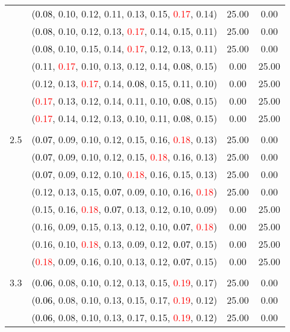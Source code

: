 \documentclass[10pt,a4paper]{report}
\begin{document}
\begin{center}
\begin{longtable}{clcc}
			&(\textcolor{black}{0.08}, 0.10, 0.12, 0.11, 0.13, 0.15, \textcolor{red}{0.17}, 0.14)&25.00&0.00\\
			&(\textcolor{black}{0.08}, 0.10, 0.12, 0.13, \textcolor{red}{0.17}, 0.14, 0.15, 0.11)&25.00&0.00\\
			&(\textcolor{black}{0.08}, 0.10, 0.15, 0.14, \textcolor{red}{0.17}, 0.12, 0.13, 0.11)&25.00&0.00\\
			&(0.11, \textcolor{red}{0.17}, 0.10, 0.13, 0.12, 0.14, \textcolor{black}{0.08}, 0.15)&0.00&25.00\\
			&(0.12, 0.13, \textcolor{red}{0.17}, 0.14, \textcolor{black}{0.08}, 0.15, 0.11, 0.10)&0.00&25.00\\
			&(\textcolor{red}{0.17}, 0.13, 0.12, 0.14, 0.11, 0.10, \textcolor{black}{0.08}, 0.15)&0.00&25.00\\
			&(\textcolor{red}{0.17}, 0.14, 0.12, 0.13, 0.10, 0.11, \textcolor{black}{0.08}, 0.15)&0.00&25.00\\
		&&&\\
		2.5			&(\textcolor{black}{0.07}, 0.09, 0.10, 0.12, 0.15, 0.16, \textcolor{red}{0.18}, 0.13)&25.00&0.00\\
			&(\textcolor{black}{0.07}, 0.09, 0.10, 0.12, 0.15, \textcolor{red}{0.18}, 0.16, 0.13)&25.00&0.00\\
			&(\textcolor{black}{0.07}, 0.09, 0.12, 0.10, \textcolor{red}{0.18}, 0.16, 0.15, 0.13)&25.00&0.00\\
			&(0.12, 0.13, 0.15, \textcolor{black}{0.07}, 0.09, 0.10, 0.16, \textcolor{red}{0.18})&25.00&0.00\\
			&(0.15, 0.16, \textcolor{red}{0.18}, \textcolor{black}{0.07}, 0.13, 0.12, 0.10, 0.09)&0.00&25.00\\
			&(0.16, 0.09, 0.15, 0.13, 0.12, 0.10, \textcolor{black}{0.07}, \textcolor{red}{0.18})&0.00&25.00\\
			&(0.16, 0.10, \textcolor{red}{0.18}, 0.13, 0.09, 0.12, \textcolor{black}{0.07}, 0.15)&0.00&25.00\\
			&(\textcolor{red}{0.18}, 0.09, 0.16, 0.10, 0.13, 0.12, \textcolor{black}{0.07}, 0.15)&0.00&25.00\\
		&&&\\
		3.3			&(\textcolor{black}{0.06}, 0.08, 0.10, 0.12, 0.13, 0.15, \textcolor{red}{0.19}, 0.17)&25.00&0.00\\
			&(\textcolor{black}{0.06}, 0.08, 0.10, 0.13, 0.15, 0.17, \textcolor{red}{0.19}, 0.12)&25.00&0.00\\
			&(\textcolor{black}{0.06}, 0.08, 0.10, 0.13, 0.17, 0.15, \textcolor{red}{0.19}, 0.12)&25.00&0.00\\

\end{longtable}
\end{center}
\end{document}
